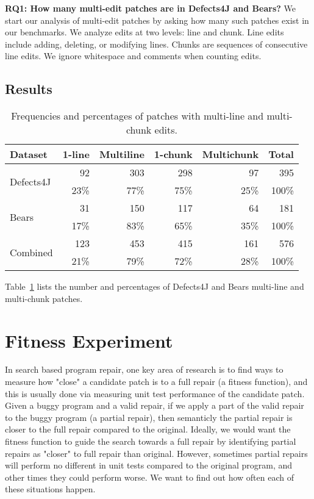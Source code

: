 \documentclass[sigconf, timestamp-false, anonymous=true]{acmart}
\begin{document}
\textbf{RQ1: How many multi-edit patches are in Defects4J and Bears?}
We start our analysis of multi-edit patches by asking how many such patches 
exist in our benchmarks. We analyze edits at two levels: line and chunk.
Line edits include adding, deleting, or modifying lines.
Chunks are sequences of consecutive line edits.
We ignore whitespace and comments when counting edits.

\subsection{Results}

\begin{table}
{\begin{center}
	\begin{tabular}{l | rrrr | r}
		\toprule
		Dataset & 1-line & Multiline & 1-chunk & Multichunk & Total \\
		\midrule
		\multirow{ 2}{*}{Defects4J} & 92 & 303 & 298 & 97 & 395 \\
		& 23\% & 77\% & 75\% & 25\% & 100\% \\
		\multirow{ 2}{*}{Bears} & 31 & 150 & 117 & 64 & 181 \\
		& 17\% & 83\% & 65\% & 35\% & 100\% \\
		\midrule
		\multirow{ 2}{*}{Combined} & 123 & 453 & 415 & 161 & 576 \\
		& 21\% & 79\% & 72\% & 28\% & 100\% \\
		\bottomrule
	\end{tabular}
 \end{center}
}
	\caption{Frequencies and percentages of patches with multi-line and multi-chunk edits.}
	\label{tab:multiedit-frequencies}
\end{table}

Table~\ref{tab:multiedit-frequencies} lists the number and percentages of Defects4J and Bears
multi-line and multi-chunk patches.

\section{Fitness Experiment}

In search based program repair, one key area of research is to find ways to measure how "close" a candidate patch is to a full repair (a fitness function),
and this is usually done via measuring unit test performance of the candidate patch. 
Given a buggy program and a valid repair, if we apply a part of the valid repair to the buggy program (a partial repair), then semanticly the partial repair is closer to the full repair compared to the original. 
Ideally, we would want the fitness function to guide the search towards a full repair by identifying partial repairs as "closer" to full repair than original.
However, sometimes partial repairs will perform no different in unit tests compared to the original program, and other times they could perform worse. We want to find out how often each of these situations happen.
\end{document}
